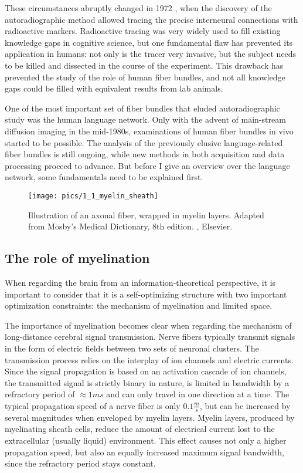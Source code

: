 These circumstances abruptly changed in 1972 \cite{1.1.history}, when the discovery of the autoradiographic method allowed tracing the precise interneural connections with radioactive markers.
Radioactive tracing was very widely used to fill existing knowledge gaps in cognitive science, but one fundamental flaw has prevented its application in humans: not only is the tracer very invasive, but the subject needs to be killed and dissected in the course of the experiment.
This drawback has prevented the study of the role of human fiber bundles, and not all knowledge gaps could be filled with equivalent results from lab animals.

One of the most important set of fiber bundles that eluded autoradiographic study was the human language network.
Only with the advent of main-stream diffusion imaging \cite{1.1.firstDiffusion} in the mid-1980s, examinations of human fiber bundles in vivo started to be possible.
The analysis of the previously elusive language-related fiber bundles is still ongoing, while new methods in both acquisition and data processing proceed to advance.
But before I give an overview over the language network, some fundamentals need to be explained first.

\begin{figure}[h]
\begin{center}
\vspace{7mm}
\texttt{[image: pics/1\_1\_myelin\_sheath]}
\caption{\label{1.1.neuron.illustrated} Illustration of an axonal fiber, wrapped in myelin layers. Adapted from Mosby's Medical Dictionary, 8th edition. , Elsevier.}
\end{center}
\end{figure}

\subsection{The role of myelination}\label{1.1.myelin}
When regarding the brain from an information-theoretical perspective, it is important to consider that it is a self-optimizing structure with two important optimization constraints: the mechanism of myelination and limited space.

The importance of myelination becomes clear when regarding the mechanism of long-distance cerebral signal transmission.
Nerve fibers typically transmit signals in the form of electric fields between two sets of neuronal clusters.
The transmission process relies on the interplay of ion channels and electric currents.
Since the signal propagation is based on an activation cascade of ion channels, the transmitted signal is strictly binary in nature, is limited in bandwidth by a refractory period of $\approx 1ms$ and can only travel in one direction at a time.
The typical propagation speed of a nerve fiber is only $0.1\frac{m}{s}$, but can be increased by several magnitudes when enveloped by myelin layers.
Myelin layers, produced by myelinating sheath cells, reduce the amount of electrical current lost to the extracellular (usually liquid) environment.
This effect causes not only a higher propagation speed, but also an equally increased maximum signal bandwidth, since the refractory period stays constant.

